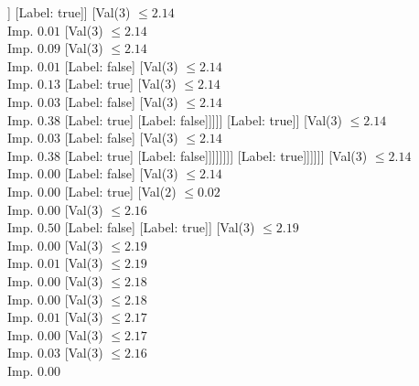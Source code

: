 \documentclass[margin=10pt]{standalone}
\begin{document}
\begin{forest}
																						[Val($3$) $ \leq 2.14$ \\ Imp. $0.50$
																							[Label: true]
																							[Label: false]]
																						[Label: true]]
																					[Val($3$) $ \leq 2.14$ \\ Imp. $0.01$
																						[Val($3$) $ \leq 2.14$ \\ Imp. $0.09$
																							[Val($3$) $ \leq 2.14$ \\ Imp. $0.01$
																								[Label: false]
																								[Val($3$) $ \leq 2.14$ \\ Imp. $0.13$
																									[Label: true]
																									[Val($3$) $ \leq 2.14$ \\ Imp. $0.03$
																										[Label: false]
																										[Val($3$) $ \leq 2.14$ \\ Imp. $0.38$
																											[Label: true]
																											[Label: false]]]]]
																							[Label: true]]
																						[Val($3$) $ \leq 2.14$ \\ Imp. $0.03$
																							[Label: false]
																							[Val($3$) $ \leq 2.14$ \\ Imp. $0.38$
																								[Label: true]
																								[Label: false]]]]]]]]
																	[Label: true]]]]]]
												[Val($3$) $ \leq 2.14$ \\ Imp. $0.00$
													[Label: false]
													[Val($3$) $ \leq 2.14$ \\ Imp. $0.00$
														[Label: true]
														[Val($2$) $ \leq 0.02$ \\ Imp. $0.00$
															[Val($3$) $ \leq 2.16$ \\ Imp. $0.50$
																[Label: false]
																[Label: true]]
															[Val($3$) $ \leq 2.19$ \\ Imp. $0.00$
																[Val($3$) $ \leq 2.19$ \\ Imp. $0.01$
																	[Val($3$) $ \leq 2.19$ \\ Imp. $0.00$
																		[Val($3$) $ \leq 2.18$ \\ Imp. $0.00$
																			[Val($3$) $ \leq 2.18$ \\ Imp. $0.01$
																				[Val($3$) $ \leq 2.17$ \\ Imp. $0.00$
																					[Val($3$) $ \leq 2.17$ \\ Imp. $0.03$
																						[Val($3$) $ \leq 2.16$ \\ Imp. $0.00$

\end{forest}
\end{document}
